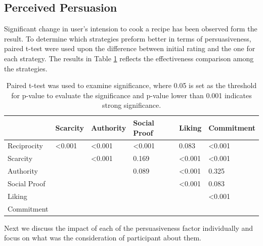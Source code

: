 \subsection{Perceived Persuasion}
Significant change in user’s intension to cook a recipe has been observed form the result. To determine which strategies preform better in terms of persuasiveness, paired t-test were used upon the difference between initial rating and the one for each strategy. The results in Table \ref{table:persusasion-result} reflects the effectiveness comparison among the strategies. 
\begin{table}[ht]
	\centering %
		\begin{tabular}{p{2cm} p{2cm} p{2cm} p{2cm} p{2cm} p{2cm}}
		\hline\hline 
	
				& Scarcity & Authority & Social Proof & Liking & Commitment\\ %
		\hline %
				Reciprocity   & <0.001  & <0.001 & <0.001 &  0.083 & <0.001 \\ %
		
		Scarcity      &         & <0.001 &  0.169 & <0.001 & <0.001 \\
		
		Authority     &         &        &  0.089 & <0.001 &  0.325 \\
		
		Social Proof  &         &        &        & <0.001 &  0.083 \\
		
		Liking        &         &        &        &        & <0.001 \\
		
		Commitment    &         &        &        &        &  \\ [1ex] %
		\hline %
			\end{tabular}
				\caption{Paired t-test was used to examine significance, where 0.05 is set as the threshold for p-value to evaluate the significance and p-value lower than 0.001 indicates strong significance.}
				\label{table:persusasion-result}

\end{table}

Next we discuss the impact of each of the persuasiveness factor individually and focus on what was the consideration of participant about them.\newline
